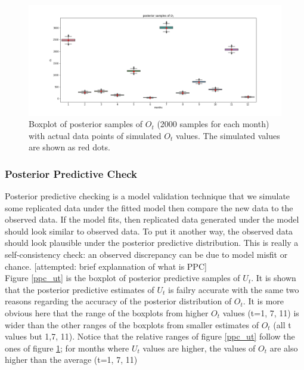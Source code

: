 \documentclass[]{article}
\begin{document}
\begin{figure}[h]
	\centering
	\includegraphics[width=1\linewidth]{Figures/earlyresult1_ot.png}
	\caption{Boxplot of posterior samples of $O_t$ (2000 samples for each month) with actual data points of simulated $O_t$ values. The simulated values are shown as red dots.}
	\label{pst_ot}
\end{figure}

\newpage
\subsubsection{Posterior Predictive Check}
Posterior predictive checking is a model validation technique that we simulate some replicated data under the fitted model then compare the new data to the observed data. If the model fits, then replicated data generated under the model should look similar to observed data. To put it another way, the observed data should look plausible under the posterior predictive distribution. This is really a self-consistency check: an observed discrepancy can be due to model misfit or chance. \cite{bda_galman}
[attempted: brief explannation of what is PPC]\\

Figure \ref{ppc_ut} is the boxplot of posterior predictive samples of $U_t$. It is shown that the posterior predictive estimates of $U_t$ is failry accurate with the same two reasons regarding the accuracy of the posterior distribution of $O_t$. It is more obvious here that the range of the boxplots from higher $O_t$ values (t=1, 7, 11) is wider than the other ranges of the boxplots from smaller estimates of $O_t$ (all t values but 1,7, 11). Notice that the relative ranges of figure \ref{ppc_ut} follow the ones of figure \ref{pst_ot}; for months where $U_t$ values are higher, the values of $O_t$ are also higher than the average (t=1, 7, 11)\\
\end{document}
